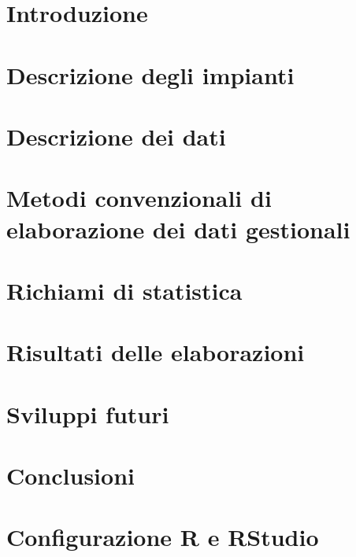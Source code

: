 \documentclass[12pt]{report}
\begin{document}
\tableofcontents
\newpage\null\thispagestyle{empty}\newpage

\chapter*{Introduzione}
\label{ch:I}


\chapter{Descrizione degli impianti}
\label{ch:1}


\chapter{Descrizione dei dati}
\label{ch:2}


\chapter{Metodi convenzionali di elaborazione dei dati gestionali}
\label{ch:3}


\chapter{Richiami di statistica}
\label{ch:4}


\chapter{Risultati delle elaborazioni}
\label{ch:5}


\chapter{Sviluppi futuri}
\label{ch:6}


\chapter*{Conclusioni}
\label{ch:C}



\appendix\chapter{Configurazione R e RStudio\texttrademark}
	\label{appendice}
	




\end{document}
